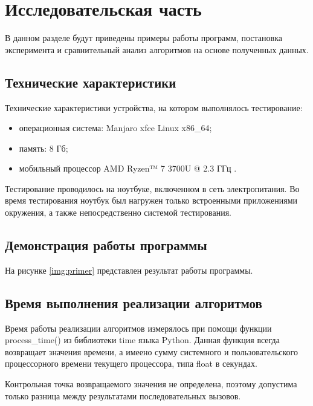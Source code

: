 \chapter{Исследовательская часть}

В данном разделе будут приведены примеры работы программ, постановка эксперимента и сравнительный анализ алгоритмов на основе полученных данных.

\section{Технические характеристики}

Технические характеристики устройства, на котором выполнялось тестирование:

\begin{itemize}
	\item операционная система: Manjaro xfce \cite{ubuntu} Linux \cite{linux} x86\_64;
	\item память: 8 Гб;
	\item мобильный процессор AMD Ryzen™ 7 3700U @ 2.3 ГГц \cite{intel}.
\end{itemize}

Тестирование проводилось на ноутбуке, включенном в сеть электропитания. Во время тестирования ноутбук был нагружен только встроенными приложениями окружения, а также непосредственно системой тестирования.

\section{Демонстрация работы программы}

На рисунке \ref{img:primer} представлен результат работы программы.

\FloatBarrier

\section{Время выполнения реализации алгоритмов}

Время работы реализации алгоритмов измерялось при помощи функции process\_time() из библиотеки time языка Python. Данная функция всегда возвращает значения времени, а имеено сумму системного и пользовательского процессорного времени текущего процессора, типа float в секундах.

Контрольная точка возвращаемого значения не определена, поэтому допустима только разница между результатами последовательных вызовов.

